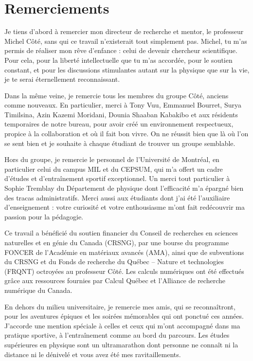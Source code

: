 \chapter*{Remerciements}

Je tiens d'abord à remercier mon directeur de recherche et mentor, le professeur Michel Côté, sans qui ce travail n'existerait tout simplement pas. Michel, tu m'as permis de réaliser mon rêve d'enfance : celui de devenir chercheur scientifique. Pour cela, pour la liberté intellectuelle que tu m'as accordée, pour le soutien constant, et pour les discussions stimulantes autant sur la physique que sur la vie, je te serai éternellement reconnaissant.

Dans la même veine, je remercie tous les membres du groupe Côté, anciens comme nouveaux. En particulier, merci à Tony Vuu, Emmanuel Bourret, Surya Timilsina, Azin Kazemi Moridani, Dounia Shaaban Kabakibo et aux résidents temporaires de notre bureau, pour avoir créé un environnement respectueux, propice à la collaboration et où il fait bon vivre. On ne réussit bien que là où l'on se sent bien et je souhaite à chaque étudiant de trouver un groupe semblable.

Hors du groupe, je remercie le personnel de l'Université de Montréal, en particulier celui du campus MIL et du CEPSUM, qui m'a offert un cadre d'études et d'entraînement sportif exceptionnel. Un merci tout particulier à Sophie Tremblay du Département de physique dont l'efficacité m'a épargné bien des tracas administratifs. Merci aussi aux étudiants dont j'ai été l'auxiliaire d'enseignement : votre curiosité et votre enthousiasme m'ont fait redécouvrir ma passion pour la pédagogie.

Ce travail a bénéficié du soutien financier du Conseil de recherches en sciences naturelles et en génie du Canada (CRSNG), par une bourse du programme FONCER de l'Académie en matériaux avancés (AMA), ainsi que de subventions du CRSNG et du Fonds de recherche du Québec -- Nature et technologies (FRQNT) octroyées au professeur Côté. Les calculs numériques ont été effectués grâce aux ressources fournies par Calcul Québec et l'Alliance de recherche numérique du Canada.

En dehors du milieu universitaire, je remercie mes amis, qui se reconnaîtront, pour les aventures épiques et les soirées mémorables qui ont ponctué ces années. J'accorde une mention spéciale à celles et ceux qui m'ont accompagné dans ma pratique sportive, à l'entraînement comme au bord du parcours. Les études supérieures en physique sont un ultramarathon dont personne ne connaît ni la distance ni le dénivelé et vous avez été mes ravitaillements.

